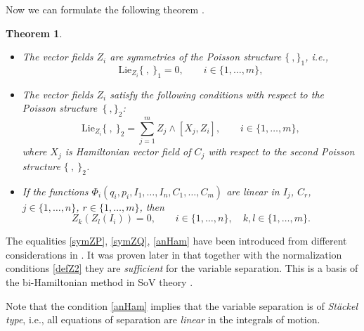 \documentclass[10pt,a4paper]{amsart}
\numberwithin{equation}{section}
\newtheorem{Theorem}{Theorem}[section]
\begin{document}
Now we can formulate the following theorem \cite{SkrAsSoVExCle}.
\begin{Theorem}\quad
\begin{itemize}
\item[$(i)$] The vector fields $Z_i$ are symmetries of the Poisson structure
$\{\ , \}_1$, i.e.,
\begin{equation}\label{symZP}
\mathrm{Lie}_{Z_i} \{\ ,\ \}_1=0, \qquad i\in \{1, \dots, m\},
\end{equation}

\item[$(ii)$] The vector fields $Z_i$ satisfy the following conditions with
respect to the Poisson structure~$\{\ , \}_2$:
\begin{equation}\label{symZQ}
\mathrm{Lie}_{Z_i} \{\ ,\ \}_2= \sum\limits_{j=1}^m Z_j \wedge [X_j, Z_i],
\qquad i\in \{1, \dots, m\},
\end{equation}
where $X_j$ is Hamiltonian vector field of $C_j$ with respect
to the second Poisson structure $\{\ ,\ \}_2$.

\item[$(iii)$] If the functions $\Phi_i(q_i,
p_i, I_1, \dots , I_n, C_1, \dots , C_m)$ are linear in $I_j$, $C_r$, $j\in
\{1, \dots, n\}$, $r\in \{1, \dots, m\}$, then
\begin{equation}\label{anHam}
Z_k (Z_l(I_i))=0, \qquad i\in \{1, \dots, n\}, \quad k,l \in \{1, \dots, m\}.
\end{equation}
\end{itemize}
\end{Theorem}

\begin{Remark}
The equalities \eqref{symZP},
\eqref{symZQ}, \eqref{anHam} have been introduced from different considerations
in \cite{MFP}. It was proven later in \cite{FP} that together with
the normalization conditions \eqref{defZ2} they are {\it sufficient} for
the variable separation. This is a basis of the
bi-Hamiltonian method in SoV theory \cite{MFP,FP,FP2}.
\end{Remark}

\begin{Remark}
 Note that the condition \eqref{anHam} implies that the variable separation is of {\it St\"ackel type}, i.e., all equations of separation are {\it linear} in the integrals of motion.
\end{Remark}
\end{document}
